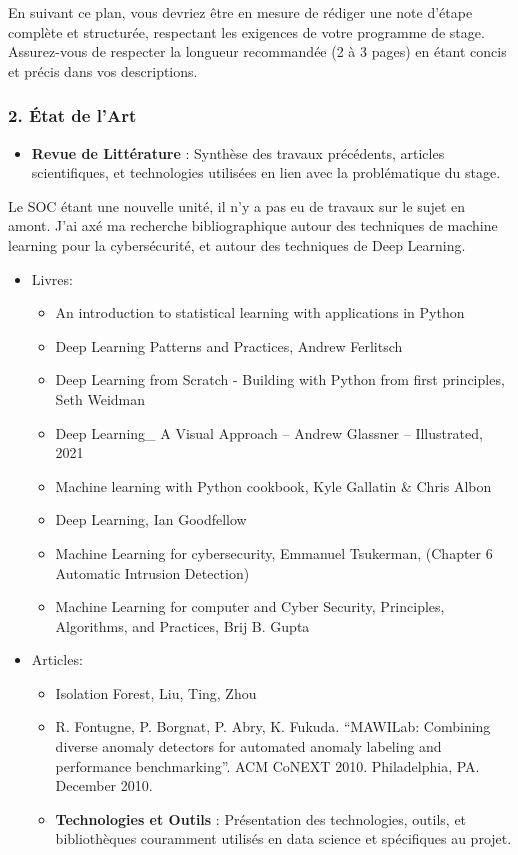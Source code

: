 \documentclass[
  letterpaper,
  DIV=11,
  numbers=noendperiod]{scrartcl}
\providecommand{\tightlist}{%
  \setlength{\itemsep}{0pt}\setlength{\parskip}{0pt}}\usepackage{longtable,booktabs,array}
\begin{document}
En suivant ce plan, vous devriez être en mesure de rédiger une note
d'étape complète et structurée, respectant les exigences de votre
programme de stage. Assurez-vous de respecter la longueur recommandée (2
à 3 pages) en étant concis et précis dans vos descriptions.

\subsubsection{2. État de l'Art}\label{uxe9tat-de-lart}

\begin{itemize}
\tightlist
\item
  \textbf{Revue de Littérature} : Synthèse des travaux précédents,
  articles scientifiques, et technologies utilisées en lien avec la
  problématique du stage.
\end{itemize}

Le SOC étant une nouvelle unité, il n'y a pas eu de travaux sur le sujet
en amont. J'ai axé ma recherche bibliographique autour des techniques de
machine learning pour la cybersécurité, et autour des techniques de Deep
Learning.

\begin{itemize}
\tightlist
\item
  Livres:

  \begin{itemize}
  \tightlist
  \item
    An introduction to statistical learning with applications in Python
  \item
    Deep Learning Patterns and Practices, Andrew Ferlitsch
  \item
    Deep Learning from Scratch - Building with Python from first
    principles, Seth Weidman
  \item
    Deep Learning\_ A Visual Approach -- Andrew Glassner -- Illustrated,
    2021
  \item
    Machine learning with Python cookbook, Kyle Gallatin \& Chris Albon
  \item
    Deep Learning, Ian Goodfellow
  \item
    Machine Learning for cybersecurity, Emmanuel Tsukerman, (Chapter 6
    Automatic Intrusion Detection)
  \item
    Machine Learning for computer and Cyber Security, Principles,
    Algorithms, and Practices, Brij B. Gupta
  \end{itemize}
\item
  Articles:

  \begin{itemize}
  \item
    Isolation Forest, Liu, Ting, Zhou
  \item
    R. Fontugne, P. Borgnat, P. Abry, K. Fukuda. ``MAWILab: Combining
    diverse anomaly detectors for automated anomaly labeling and
    performance benchmarking''. ACM CoNEXT 2010. Philadelphia, PA.
    December 2010.
  \item
    \textbf{Technologies et Outils} : Présentation des technologies,
    outils, et bibliothèques couramment utilisés en data science et
    spécifiques au projet.
  \end{itemize}
\end{itemize}
\end{document}
